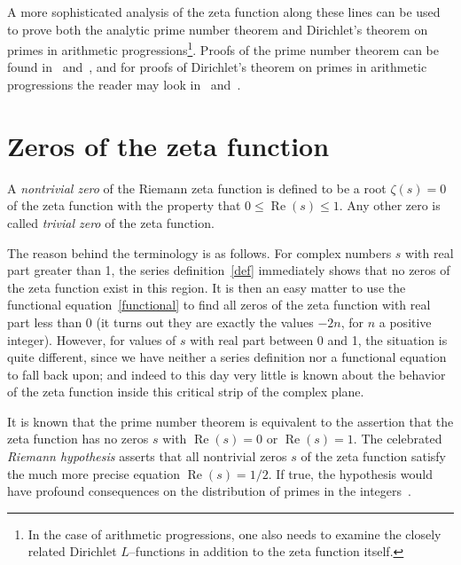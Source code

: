 \documentclass[12pt]{article}
\renewcommand{\Re}{\operatorname{Re}}
\theoremstyle{definition}
\begin{document}
A more sophisticated analysis of the zeta function along these lines
can be used to prove both the analytic prime number theorem and
Dirichlet's theorem on primes in arithmetic progressions\footnote{In the case of arithmetic progressions, one also needs to examine the closely related Dirichlet $L$--functions in addition to the zeta function itself.}. Proofs of
the prime number theorem can be found in~\cite{bak-newman}
and~\cite{patterson}, and for proofs of Dirichlet's theorem on primes
in arithmetic progressions the reader may look in~\cite{janusz}
and~\cite{serre}.

\section{Zeros of the zeta function}

A \emph{nontrivial zero} of the Riemann zeta function is defined to be
a root $\zeta(s) = 0$ of the zeta function with the property that $0
\leq \Re(s) \leq 1$. Any other zero is called \emph{trivial zero} of
the zeta function.

The reason behind the terminology is as follows. For complex numbers
$s$ with real part greater than 1, the series definition~\eqref{def}
immediately shows that no zeros of the zeta function exist in this
region. It is then an easy matter to use the functional
equation~\eqref{functional} to find all zeros of the zeta function
with real part less than 0 (it turns out they are exactly the values
$-2n$, for $n$ a positive integer). However, for values of $s$ with
real part between 0 and 1, the situation is quite different, since we
have neither a series definition nor a functional equation to fall
back upon; and indeed to this day very little is known about the
behavior of the zeta function inside this critical strip of the
complex plane.

It is known that the prime number theorem is equivalent to the
assertion that the zeta function has no zeros $s$ with $\Re(s) = 0$ or
$\Re(s) = 1$. The celebrated \emph{Riemann hypothesis} asserts that all nontrivial zeros $s$ of the zeta function satisfy the much more precise equation $\Re(s) = 1/2$. If true, the hypothesis would have profound
consequences on the distribution of primes in the
integers~\cite{patterson}.

\newpage
\end{document}
